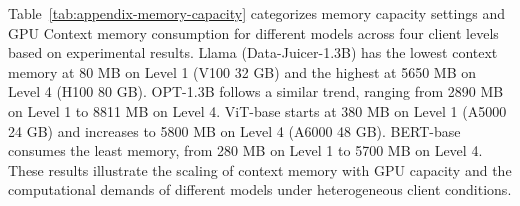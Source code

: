 \documentclass[sigconf]{acmart}
\begin{document}
    \begin{table}[t]
      \centering
      \caption{Memory capacity settings and context memory consumptions for heterogeneous client groups.}
      \label{tab:appendix-memory-capacity}%
    \end{table}%

    Table~\ref{tab:appendix-memory-capacity} categorizes memory capacity settings and GPU Context memory consumption for different models across four client levels based on experimental results. Llama (Data-Juicer-1.3B) has the lowest context memory at 80 MB on Level 1 (V100 32 GB) and the highest at 5650 MB on Level 4 (H100 80 GB). OPT-1.3B follows a similar trend, ranging from 2890 MB on Level 1 to 8811 MB on Level 4. ViT-base starts at 380 MB on Level 1 (A5000 24 GB) and increases to 5800 MB on Level 4 (A6000 48 GB). BERT-base consumes the least memory, from 280 MB on Level 1 to 5700 MB on Level 4. These results illustrate the scaling of context memory with GPU capacity and the computational demands of different models under heterogeneous client conditions.
\end{document}
